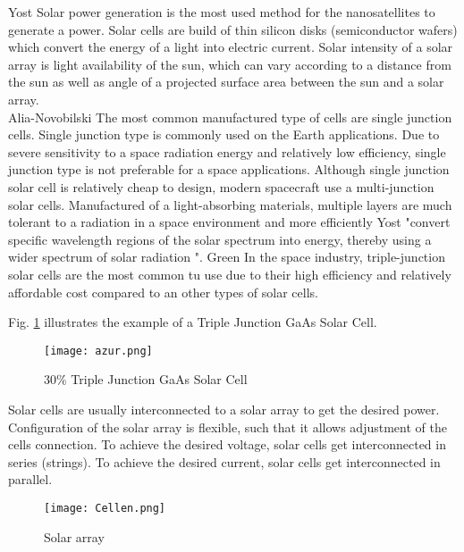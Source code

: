 Yost\cite{1} Solar power generation is the most used method for the nanosatellites to generate a power. Solar cells are build of thin silicon disks (semiconductor wafers)  which convert the energy of a light into electric current. Solar intensity of a solar array is light availability of the sun, which can vary according to a distance from the sun as well as angle of a projected surface area between the sun and a solar array.  
\\
\noindent\hspace*{3mm} Alia-Novobilski\cite{2} The most common manufactured type of cells are single junction cells. Single junction type is commonly used on the Earth applications. Due to severe sensitivity to a space radiation energy and relatively low efficiency, single junction type is not preferable for a space applications. Although single junction solar cell is relatively cheap to design, modern spacecraft use a multi-junction solar cells. Manufactured of a light-absorbing materials, multiple layers are much tolerant to a radiation in a space environment and more efficiently  Yost\cite{1} "convert specific wavelength regions of the solar spectrum into energy, thereby using a wider spectrum of solar radiation ". 
Green\cite{3} In the space industry, triple-junction solar cells are the most common tu use due to their high efficiency and relatively affordable cost compared to an other types of solar cells.

Fig. \ref{fig: GaAs} illustrates the example of a Triple Junction GaAs Solar Cell.

\begin{figure}[h]
	\centering
	\texttt{[image: azur.png]}
	\caption{ 30\% Triple Junction GaAs Solar Cell \cite{4}}
	\label{fig: GaAs}
\end{figure}

Solar cells are usually interconnected to a solar array to get the desired power. Configuration of the solar array is flexible, such that it allows adjustment of the cells connection. To achieve the desired voltage, solar cells get interconnected in series (strings). To achieve the desired current, solar cells get interconnected in parallel.\\

\newpage

\begin{figure}[h]
	\centering
	\texttt{[image: Cellen.png]}
	\caption{ Solar array}
	\label{array}
\end{figure}
	
